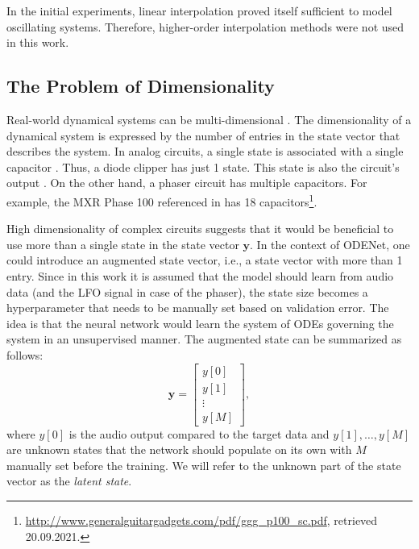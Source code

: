 In the initial experiments, linear interpolation proved itself sufficient to model oscillating systems. Therefore, higher-order interpolation methods were not used in this work.

\subsection{The Problem of Dimensionality}
\label{subsec:dimensionality}
Real-world dynamical systems can be multi-dimensional \cite{Scheinerman1996}. The dimensionality of a dynamical system is expressed by the number of entries in the state vector that describes the system. In analog circuits, a single state is associated with a single capacitor \cite{Parker2019}. Thus, a diode clipper has just 1 state. This state is also the circuit's output \cite{Parker2019}. On the other hand, a phaser circuit has multiple capacitors. For example, the MXR Phase 100 referenced in \cite{Kiiski2016} has 18 capacitors\footnote{\url{http://www.generalguitargadgets.com/pdf/ggg_p100_sc.pdf}, retrieved 20.09.2021.}.

High dimensionality of complex circuits suggests that it would be beneficial to use more than a single state in the state vector $\pmb{y}$. In the context of ODENet, one could introduce an augmented state vector, i.e., a state vector with more than 1 entry. Since in this work it is assumed that the model should learn from audio data (and the LFO signal in case of the phaser), the state size becomes a hyperparameter that needs to be manually set based on validation error. The idea is that the neural network would learn the system of \acp{ODE} governing the system in an unsupervised manner. The augmented state can be summarized as follows:
\begin{equation}
  \pmb{y} = \begin{bmatrix}
    y[0] \\
    y[1] \\
    \vdots \\
    y[M]
  \end{bmatrix},
\end{equation}
where $y[0]$ is the audio output compared to the target data and $y[1], \dots, y[M]$ are unknown states that the network should populate on its own with $M$ manually set before the training. We will refer to the unknown part of the state vector as the \emph{latent state}.

